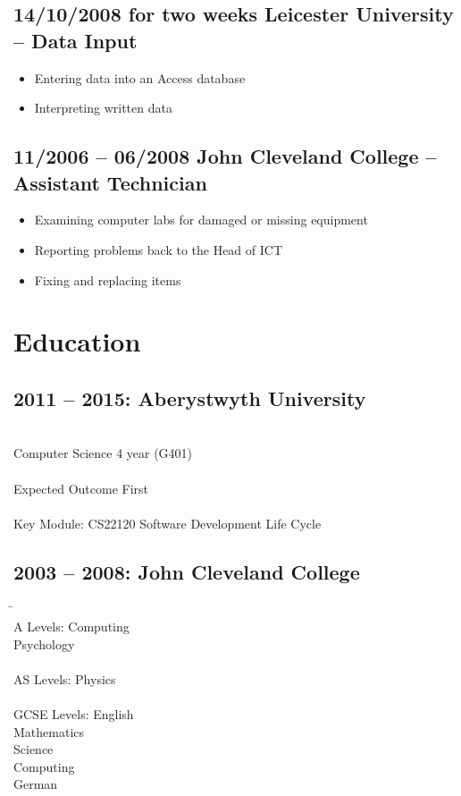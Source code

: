 \documentclass[0pt]{article}
\begin{document}
\subsection*{14/10/2008 for two weeks     Leicester University --  Data Input}
\begin{itemize}
	\item Entering data into an Access database
	\item Interpreting written data
\end{itemize}

\subsection*{11/2006 -- 06/2008      John Cleveland College -- Assistant Technician}
\begin{itemize}
	\item Examining computer labs for damaged or missing equipment
	\item Reporting problems back to the Head of ICT
	\item Fixing and replacing items
\end{itemize}

\section*{Education}
\subsection*{2011 -- 2015: Aberystwyth University}
\begin{tabbing}
~~~~~~~~~~~~~~~~~~~~~~~~\=\\
\> Computer Science 4 year (G401)\\
\\
\> Expected Outcome First\\
\\
\> Key Module: CS22120 Software Development Life Cycle   
\end{tabbing}

\subsection*{2003 -- 2008: John Cleveland College}  
\begin{tabbing}
\=~~~~~~~~~~~~~~~~~~~~~~~~\=\\
\> A Levels:  \>Computing \\

\>\>Psychology\\
\\
\> AS Levels: \>Physics \\
\\
\> GCSE Levels: \>English\\

\>\>Mathematics\\

\>\>Science\\

\>\>Computing\\

\>\>German\\
\end{tabbing}
\end{document}
